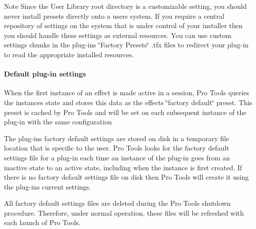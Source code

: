 \begin{DoxyNote}{Note}
Since the User Library root directory is a customizable setting, you should never install presets directly onto a user\textquotesingle{}s system. If you require a central repository of settings on the system that is under control of your installer then you should handle these settings as external resources. You can use custom settings chunks in the plug-\/in\textquotesingle{}s \char`\"{}\+Factory Presets\char`\"{} .tfx files to redirect your plug-\/in to read the appropriate installed resources.
\end{DoxyNote}
\hypertarget{a00360_subsubsection__default_plugin_settings_}{}\paragraph{Default plug-\/in settings}\label{a00360_subsubsection__default_plugin_settings_}
 When the first instance of an effect is made active in a session, Pro Tools queries the instance\textquotesingle{}s state and stores this data as the effect\textquotesingle{}s \char`\"{}factory default\char`\"{} preset. This preset is cached by Pro Tools and will be set on each subsequent instance of the plug-\/in with the same configuration

The plug-\/in\textquotesingle{}s factory default settings are stored on disk in a temporary file location that is specific to the user. Pro Tools looks for the factory default settings file for a plug-\/in each time an instance of the plug-\/in goes from an inactive state to an active state, including when the instance is first created. If there is no factory default settings file on disk then Pro Tools will create it using the plug-\/in\textquotesingle{}s current settings.

All factory default settings files are deleted during the Pro Tools shutdown procedure. Therefore, under normal operation, these files will be refreshed with each launch of Pro Tools.

